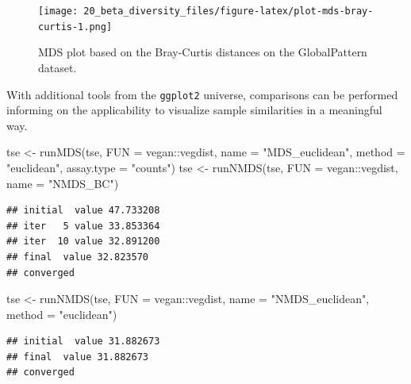 \documentclass[
]{book}
\newenvironment{Shaded}{\begin{snugshade}}{\end{snugshade}}
\newcommand{\AttributeTok}[1]{\textcolor[rgb]{0.77,0.63,0.00}{#1}}
\newcommand{\FunctionTok}[1]{\textcolor[rgb]{0.00,0.00,0.00}{#1}}
\newcommand{\NormalTok}[1]{#1}
\newcommand{\OtherTok}[1]{\textcolor[rgb]{0.56,0.35,0.01}{#1}}
\newcommand{\SpecialCharTok}[1]{\textcolor[rgb]{0.00,0.00,0.00}{#1}}
\newcommand{\StringTok}[1]{\textcolor[rgb]{0.31,0.60,0.02}{#1}}
\begin{document}
\begin{figure}
\centering
\texttt{[image: 20\_beta\_diversity\_files/figure-latex/plot-mds-bray-curtis-1.png]}
\caption{\label{fig:plot-mds-bray-curtis}MDS plot based on the Bray-Curtis distances on the GlobalPattern dataset.}
\end{figure}

With additional tools from the \texttt{ggplot2} universe, comparisons can be
performed informing on the applicability to visualize sample similarities in a
meaningful way.

\begin{Shaded}
\begin{Highlighting}[]
\NormalTok{tse }\OtherTok{\textless{}{-}} \FunctionTok{runMDS}\NormalTok{(tse, }\AttributeTok{FUN =}\NormalTok{ vegan}\SpecialCharTok{::}\NormalTok{vegdist, }\AttributeTok{name =} \StringTok{"MDS\_euclidean"}\NormalTok{,}
             \AttributeTok{method =} \StringTok{"euclidean"}\NormalTok{, }\AttributeTok{assay.type =} \StringTok{"counts"}\NormalTok{)}
\NormalTok{tse }\OtherTok{\textless{}{-}} \FunctionTok{runNMDS}\NormalTok{(tse, }\AttributeTok{FUN =}\NormalTok{ vegan}\SpecialCharTok{::}\NormalTok{vegdist, }\AttributeTok{name =} \StringTok{"NMDS\_BC"}\NormalTok{)}
\end{Highlighting}
\end{Shaded}

\begin{verbatim}
## initial  value 47.733208 
## iter   5 value 33.853364
## iter  10 value 32.891200
## final  value 32.823570 
## converged
\end{verbatim}

\begin{Shaded}
\begin{Highlighting}[]
\NormalTok{tse }\OtherTok{\textless{}{-}} \FunctionTok{runNMDS}\NormalTok{(tse, }\AttributeTok{FUN =}\NormalTok{ vegan}\SpecialCharTok{::}\NormalTok{vegdist, }\AttributeTok{name =} \StringTok{"NMDS\_euclidean"}\NormalTok{,}
               \AttributeTok{method =} \StringTok{"euclidean"}\NormalTok{)}
\end{Highlighting}
\end{Shaded}

\begin{verbatim}
## initial  value 31.882673 
## final  value 31.882673 
## converged
\end{verbatim}
\end{document}
